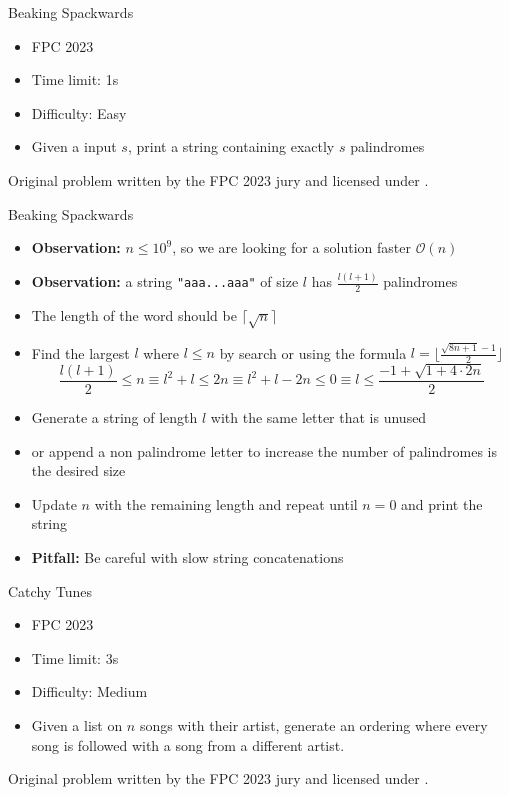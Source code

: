 \documentclass[11pt,pdf, aspectratio=169]{beamer}
\begin{document}
  \begin{frame}{Beaking Spackwards}
    \begin{itemize}
      \item FPC 2023
      \item Time limit: 1s
      \item Difficulty: Easy
      \item Given a input $s$, print a string containing exactly $s$ palindromes
    \end{itemize}
    Original problem written by the FPC 2023 jury and licensed under \doclicenseLongNameRef.

    \doclicenseImage

  \end{frame}
  \begin{frame}{Beaking Spackwards}
    \begin{itemize}
      \item<1-> \textbf{Observation:} $n \leq 10^9$, so we are looking for a solution faster $\mathcal{O}(n)$
      \item<2-> \textbf{Observation:} a string \texttt{"aaa...aaa"} of size $l$ has $\frac{l(l+1)}{2}$ palindromes
      \item<3->  The length of the word should be $\lceil\sqrt{n}\rceil$
      \item<4-> Find the largest $l$ where $l \leq n$ by search or using the formula $l = \lfloor\frac{\sqrt {8n + 1}-1}{2}\rfloor$\\\[
                                                                                                                                       \frac{l(l+1)}{2}\leq n \equiv l^2+l \leq 2n \equiv l^2+l-2n \leq 0 \equiv l \leq \frac{-1 + \sqrt {1+4\cdot 2n}}{2}\]
      \item<5-> Generate a string of length $l$ with the same letter that is unused
      \item<5-> or append a non palindrome letter to increase the number of palindromes is the desired size
      \item<5-> Update $n$ with the remaining length and repeat until $n=0$ and print the string
      \item<6-> \textbf{Pitfall:} Be careful with slow string concatenations
    \end{itemize}
  \end{frame}
  \begin{frame}{Catchy Tunes}
    \begin{itemize}
      \item FPC 2023
      \item Time limit: 3s
      \item Difficulty: Medium
      \item Given a list on $n$ songs with their artist, generate an ordering where every song is followed with a song from a different artist.
    \end{itemize}
    Original problem written by the FPC 2023 jury and licensed under \doclicenseLongNameRef.

    \doclicenseImage

  \end{frame}
\end{document}
